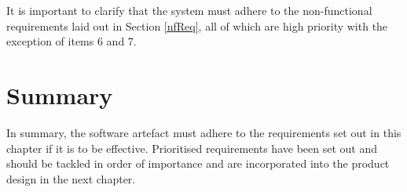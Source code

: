 It is important to clarify that the system must adhere to the non-functional requirements laid out in Section \ref{nfReq}, all of which are high priority with the exception of items 6 and 7. \revisit

\section{Summary}
In summary, the software artefact must adhere to the requirements set out in this chapter if it is to be effective.  Prioritised requirements have been set out and should be tackled in order of importance and are incorporated into the product design in the next chapter. 